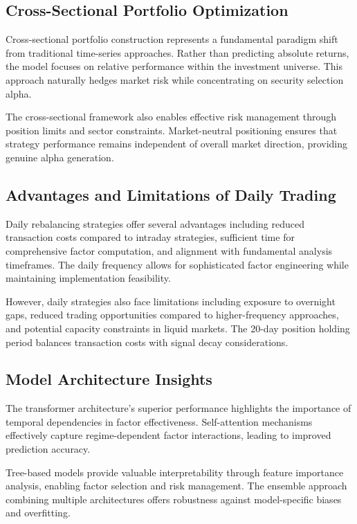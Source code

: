 \documentclass[conference]{IEEEtran}
\begin{document}
\subsection{Cross-Sectional Portfolio Optimization}

Cross-sectional portfolio construction represents a fundamental paradigm shift from traditional time-series approaches. Rather than predicting absolute returns, the model focuses on relative performance within the investment universe. This approach naturally hedges market risk while concentrating on security selection alpha.

The cross-sectional framework also enables effective risk management through position limits and sector constraints. Market-neutral positioning ensures that strategy performance remains independent of overall market direction, providing genuine alpha generation.

\subsection{Advantages and Limitations of Daily Trading}

Daily rebalancing strategies offer several advantages including reduced transaction costs compared to intraday strategies, sufficient time for comprehensive factor computation, and alignment with fundamental analysis timeframes. The daily frequency allows for sophisticated factor engineering while maintaining implementation feasibility.

However, daily strategies also face limitations including exposure to overnight gaps, reduced trading opportunities compared to higher-frequency approaches, and potential capacity constraints in liquid markets. The 20-day position holding period balances transaction costs with signal decay considerations.

\subsection{Model Architecture Insights}

The transformer architecture's superior performance highlights the importance of temporal dependencies in factor effectiveness. Self-attention mechanisms effectively capture regime-dependent factor interactions, leading to improved prediction accuracy.

Tree-based models provide valuable interpretability through feature importance analysis, enabling factor selection and risk management. The ensemble approach combining multiple architectures offers robustness against model-specific biases and overfitting.
\end{document}
